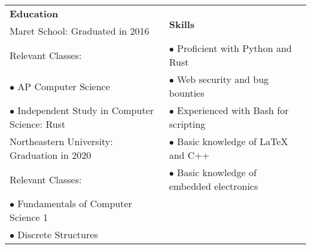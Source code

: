 \documentclass{article}
\begin{document}
\begin{table}[!htp]
\centering
\begin{tabular}{ll} 
\multirow{2}{12cm}{\textbf{\Large Education}}                   &                                                           \\
                                                                &          \multirow{2}{*}{\textbf{\Large Skills}}          \\
\large Maret School: Graduated in 2016                          &                                                           \\
\large Relevant Classes:                                        & \large $\bullet$ Proficient with Python and Rust          \\
\large $\bullet$ AP Computer Science                            & \large $\bullet$ Web security and bug bounties            \\
\large $\bullet$ Independent Study in Computer Science: Rust    & \large $\bullet$ Experienced with Bash for scripting      \\
\large Northeastern University: Graduation in 2020              & \large $\bullet$ Basic knowledge of LaTeX and C++         \\
\large Relevant Classes:                                        & \large $\bullet$ Basic knowledge of embedded electronics  \\
\large $\bullet$ Fundamentals of Computer Science 1             &                                                           \\
\large $\bullet$ Discrete Structures                            &                                    
\end{tabular}
\end{table}

\vspace{-6mm}
\underline{\hspace{19cm}}
\vspace{-4mm}
\end{document}
